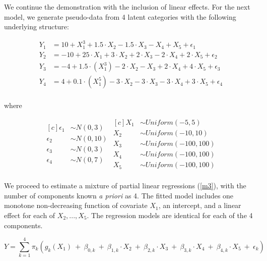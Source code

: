 \documentclass[10pt]{olplainarticle}\usepackage[]{graphicx}\usepackage[]{color}
\begin{document}
We continue the demonstration with the inclusion of linear effects. For the next model, we generate pseudo-data from 4 latent categories with the following underlying structure:


\begin{align*}
  Y_{1} &= 10 + X_1^3 + 1.5\cdot X_2 - 1.5\cdot X_3 - X_4 + X_5 + \epsilon_1 \\
  Y_{2} &= -10 + 25 \cdot X_1 + 3\cdot X_2 + 2\cdot X_3 - 2\cdot X_4 + 2\cdot X_5 + \epsilon_2 \\
  Y_{3} &= -4 + 1.5 \cdot (X_1^3) - 2\cdot X_2 - X_3 + 2\cdot X_4 + 4\cdot X_5 + \epsilon_3 \\
  Y_{4} &= 4 + 0.1 \cdot (X_1^5) - 3\cdot X_2 - 3\cdot X_3 - 3\cdot X_4 + 3\cdot X_5 + \epsilon_4 \\
\end{align*}

where 

\begin{equation*}
\begin{aligned}[c]
  \epsilon_1 &\sim N(0,3) \\
  \epsilon_2 &\sim N(0,10) \\
  \epsilon_3 &\sim N(0,3) \\
  \epsilon_4 &\sim N(0,7) \\
\end{aligned}
\begin{aligned}[c]
  X_1 &\sim Uniform(-5,5) \\
  X_2 &\sim Uniform(-10,10) \\
  X_3 &\sim Uniform(-100,100) \\
  X_4 &\sim Uniform(-100,100) \\
  X_5 &\sim Uniform(-100,100) \\
\end{aligned}
\end{equation*}


We proceed to estimate a mixture of partial linear regressions (\ref{m3}), with the number of components known \emph{a priori} as 4. The fitted model includes one monotone non-decreasing function of covariate $X_1$, an intercept, and a linear effect for each of $X_2,...,X_5$. The regression models are identical for each of the 4 components.

\begin{equation} \label{m3}
  Y = \sum_{k=1}^{4}\pi_k (g_{k} (X_1) \ +\  \beta_{0,k} \ +\ \beta_{1,k}\cdot X_2 \ +\ \beta_{2,k}\cdot X_3 \ +\ \beta_{3,k}\cdot X_4 \ +\ \beta_{4,k}\cdot X_5 \ +\ \epsilon_k)
\end{equation}
\end{document}
